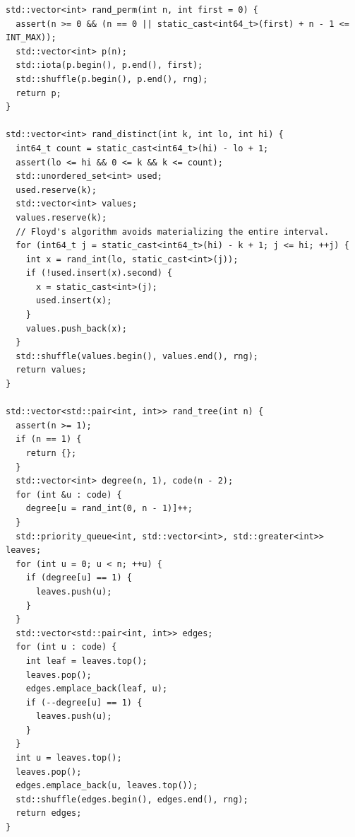 \begin{lstlisting}[style=cpp]
std::vector<int> rand_perm(int n, int first = 0) {
  assert(n >= 0 && (n == 0 || static_cast<int64_t>(first) + n - 1 <= INT_MAX));
  std::vector<int> p(n);
  std::iota(p.begin(), p.end(), first);
  std::shuffle(p.begin(), p.end(), rng);
  return p;
}

std::vector<int> rand_distinct(int k, int lo, int hi) {
  int64_t count = static_cast<int64_t>(hi) - lo + 1;
  assert(lo <= hi && 0 <= k && k <= count);
  std::unordered_set<int> used;
  used.reserve(k);
  std::vector<int> values;
  values.reserve(k);
  // Floyd's algorithm avoids materializing the entire interval.
  for (int64_t j = static_cast<int64_t>(hi) - k + 1; j <= hi; ++j) {
    int x = rand_int(lo, static_cast<int>(j));
    if (!used.insert(x).second) {
      x = static_cast<int>(j);
      used.insert(x);
    }
    values.push_back(x);
  }
  std::shuffle(values.begin(), values.end(), rng);
  return values;
}

std::vector<std::pair<int, int>> rand_tree(int n) {
  assert(n >= 1);
  if (n == 1) {
    return {};
  }
  std::vector<int> degree(n, 1), code(n - 2);
  for (int &u : code) {
    degree[u = rand_int(0, n - 1)]++;
  }
  std::priority_queue<int, std::vector<int>, std::greater<int>> leaves;
  for (int u = 0; u < n; ++u) {
    if (degree[u] == 1) {
      leaves.push(u);
    }
  }
  std::vector<std::pair<int, int>> edges;
  for (int u : code) {
    int leaf = leaves.top();
    leaves.pop();
    edges.emplace_back(leaf, u);
    if (--degree[u] == 1) {
      leaves.push(u);
    }
  }
  int u = leaves.top();
  leaves.pop();
  edges.emplace_back(u, leaves.top());
  std::shuffle(edges.begin(), edges.end(), rng);
  return edges;
}


\end{lstlisting}
